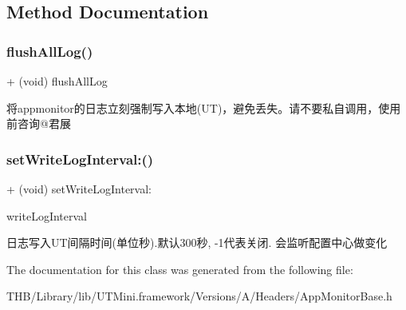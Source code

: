 \subsection{Method Documentation}
\mbox{\label{interface_app_monitor_base_adcba6f18de71fd598f4fa88fd7c76e2b}} 
\subsubsection{\texorpdfstring{flush\+All\+Log()}{flushAllLog()}}
{\footnotesize\ttfamily + (void) flush\+All\+Log \begin{DoxyParamCaption}{ }\end{DoxyParamCaption}}

将appmonitor的日志立刻强制写入本地(\+U\+T)，避免丢失。请不要私自调用，使用前咨询@君展 \mbox{\label{interface_app_monitor_base_abecd4ef5619d223b35720cfb52920e67}} 
\subsubsection{\texorpdfstring{set\+Write\+Log\+Interval\+:()}{setWriteLogInterval:()}}
{\footnotesize\ttfamily + (void) set\+Write\+Log\+Interval\+: \begin{DoxyParamCaption}\item[{(N\+S\+Integer)}]{write\+Log\+Interval }\end{DoxyParamCaption}}

日志写入\+U\+T间隔时间(单位秒).默认300秒, -\/1代表关闭. 会监听配置中心做变化 

The documentation for this class was generated from the following file\+:\begin{DoxyCompactItemize}
\item 
T\+H\+B/\+Library/lib/\+U\+T\+Mini.\+framework/\+Versions/\+A/\+Headers/App\+Monitor\+Base.\+h\end{DoxyCompactItemize}
